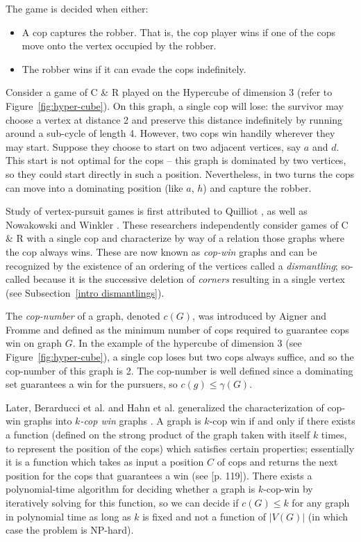 The game is decided when either:
\begin{itemize}
\item A cop captures the robber. That is, the cop player wins if one of the cops move onto the vertex
occupied by the robber.
\item The robber wins if it can evade the cops indefinitely.
\end{itemize}

Consider a game of C \& R played on the Hypercube of dimension 3 (refer to Figure~\ref{fig:hyper-cube}). On this graph, a single cop will lose: the survivor may choose a vertex at distance 2 and preserve this distance indefinitely by running around a sub-cycle of length 4. However, two cops win handily wherever they may start. Suppose they choose to start on two adjacent vertices, say $a$ and $d$. This start is not optimal for the cops -- this graph is dominated by two vertices, so they could start directly in such a position. Nevertheless, in two turns the cops can move into a dominating position (like $a$, $h$) and capture the robber.

Study of vertex-pursuit games is first attributed to Quilliot \cite{quilliot1978jeux, quilliot1983problemes}, as well as Nowakowski and Winkler \cite{nowakowski1983vertex}.
These researchers independently consider games of C \& R with a single cop and characterize by way of a relation those graphs where the cop always wins. These are now known as \textit{cop-win} graphs
and can be recognized by the existence of an ordering of the vertices called a \textit{dismantling};
so-called because it is the successive deletion of \textit{corners} resulting in a single vertex (see Subsection~\ref{intro dismantlings}).

The \textit{cop-number} of a graph, denoted $c(G)$, was introduced by Aigner and Fromme  \cite{aigner1984game} and defined as the minimum number of cops required
to guarantee cops win on graph $G$. In the example of the hypercube of dimension 3 (see Figure~\ref{fig:hyper-cube}), a single cop loses but two cops always suffice, and so the cop-number of this graph is 2. The cop-number is well defined since a dominating set guarantees a win for the pursuers, so $c(g) \leq \gamma(G)$.


Later, Berarducci et al. and Hahn et al. generalized the characterization of cop-win graphs
into \textit{$k$-cop win} graphs \cite{berarducci1993cop, hahn2003characterisation}. A graph is $k$-cop win if and only if there exists a function (defined on the strong product of the graph taken with itself $k$ times, to represent the position of the cops) which satisfies certain properties; essentially it is a function which takes as input a position $C$ of cops and returns the next position for the cops that guarantees a win (see \cite{bonato2011game}[p. 119]).
There exists a polynomial-time algorithm for deciding whether a graph is $k$-cop-win by iteratively
solving for this function, so we can decide if $c(G) \leq k$ for any graph in polynomial time as long as $k$ is fixed and not a function of $\lvert V(G) \rvert$ (in which case the problem is NP-hard).

